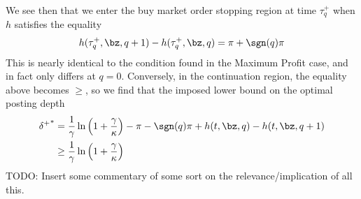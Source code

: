 \documentclass[12pt]{article}
\begin{document}
We see then that we enter the buy market order stopping region at time $\tau_q^+$ when $h$ satisfies the equality
\begin{equation}
\label{eq:buyMOfeedbackcase2}
h(\tau^+_q, \bz, q+1) - h(\tau^+_q,\bz,q) = \pi + \sgn(q) \pi
\end{equation}
This is nearly identical to the condition found in the Maximum Profit case, and in fact only differs at $q=0$. Conversely, in the continuation region, the equality above becomes $\geq$, so we find that the imposed lower bound on the optimal posting depth
\begin{align}
{\delta^+}^* & = \frac{1}{\gamma} \ln \left( 1 + \frac{\gamma}{\kappa}\right) - \pi - \sgn(q)\pi + h(t,\bz,q) - h(t,\bz,q+1) \nonumber \\
& \geq \frac{1}{\gamma} \ln \left( 1 + \frac{\gamma}{\kappa}\right)
\end{align}
TODO: Insert some commentary of some sort on the relevance/implication of all this.
\end{document}
